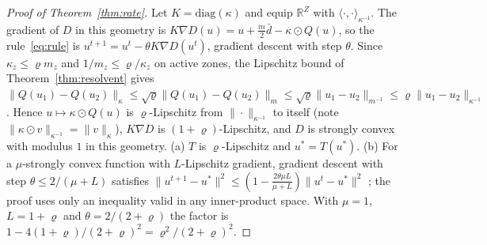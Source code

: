 \documentclass[preprint,11pt]{elsarticle}
\theoremstyle{definition}
\theoremstyle{remark}
\newcommand{\R}{\mathbb{R}}
\newcommand{\ip}[2]{\langle #1,#2\rangle}
\begin{document}
\begin{proof}[Proof of Theorem~\ref{thm:rate}]
Let $K=\mathrm{diag}(\kappa)$ and equip $\R^Z$ with $\ip\cdot\cdot_{\kappa^{-1}}$. The gradient of $D$ in this geometry is $K\nabla D(u)=u+\tfrac m2\bar d-\kappa\odot Q(u)$, so the rule~\eqref{eq:rule} is $u^{t+1}=u^t-\theta K\nabla D(u^t)$, gradient descent with step $\theta$. Since $\kappa_z\le\varrho m_z$ and $1/m_z\le\varrho/\kappa_z$ on active zones, the Lipschitz bound of Theorem~\ref{thm:resolvent} gives $\|Q(u_1)-Q(u_2)\|_\kappa\le\sqrt\varrho\|Q(u_1)-Q(u_2)\|_m\le\sqrt\varrho\|u_1-u_2\|_{m^{-1}}\le\varrho\|u_1-u_2\|_{\kappa^{-1}}$. Hence $u\mapsto\kappa\odot Q(u)$ is $\varrho$-Lipschitz from $\|\cdot\|_{\kappa^{-1}}$ to itself (note $\|\kappa\odot v\|_{\kappa^{-1}}=\|v\|_\kappa$), $K\nabla D$ is $(1+\varrho)$-Lipschitz, and $D$ is strongly convex with modulus $1$ in this geometry. (a) $T$ is $\varrho$-Lipschitz and $u^*=T(u^*)$. (b) For a $\mu$-strongly convex function with $L$-Lipschitz gradient, gradient descent with step $\theta\le2/(\mu+L)$ satisfies $\|u^{t+1}-u^*\|^2\le(1-\tfrac{2\theta\mu L}{\mu+L})\|u^t-u^*\|^2$ \citep[Theorem 2.1.15]{Nesterov2004}; the proof uses only an inequality valid in any inner-product space. With $\mu=1$, $L=1+\varrho$ and $\theta=2/(2+\varrho)$ the factor is $1-4(1+\varrho)/(2+\varrho)^2=\varrho^2/(2+\varrho)^2$.
\end{proof}
\end{document}
